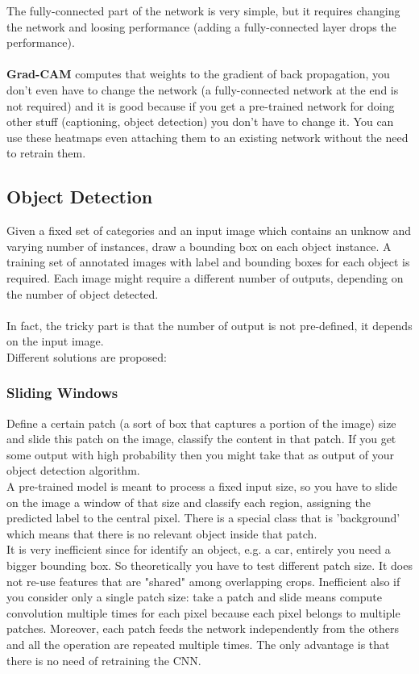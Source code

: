 The fully-connected part of the network is very simple, but it requires changing the network and loosing performance (adding a fully-connected layer drops the performance).\\ \\
\textbf{Grad-CAM} computes that weights to the gradient of back propagation, you don't even have to change the network (a fully-connected network at the end is not required) and it is good because if you get a pre-trained network for doing other stuff (captioning, object detection) you don't have to change it. You can use these heatmaps even attaching them to an existing network without the need to retrain them. 

\subsection{Object Detection}
Given a fixed set of categories and an input image which contains an unknow and varying number of instances, draw a bounding box on each object instance. A training set of annotated images with label and bounding boxes for each object is required. Each image might require a different number of outputs, depending on the number of object detected. \\ \\

In fact, the tricky part is that the number of output is not pre-defined, it depends on the input image. \\
Different solutions are proposed:

\subsubsection{Sliding Windows}
Define a certain patch (a sort of box that captures a portion of the image) size and slide this patch on the image, classify the content in that patch. If you get some output with high probability then you might take that as output of your object detection algorithm. \\
A pre-trained model is meant to process a fixed input size, so you have to slide on the image a window of that size and classify each region, assigning the predicted label to the central pixel.
There is a special class that is 'background' which means that there is no relevant object inside that patch. \\
It is very inefficient since for identify an object, e.g. a car, entirely you need a bigger bounding box. So theoretically you have to test different patch size. It does not re-use features that are "shared" among overlapping crops.  Inefficient also if you consider only a single patch size: take a patch and slide means compute convolution multiple times for each pixel because each pixel belongs to multiple patches. Moreover, each patch feeds the network independently from the others and all the operation are repeated multiple times. 
The only advantage is that there is no need of retraining the CNN.

